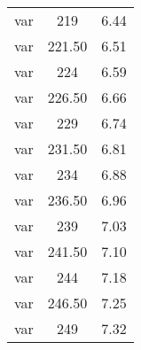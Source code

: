 \begin{table}[h]
\begin{center}
\begin{tabular}{ccc}
var & 219 & 6.44 \\

var & 221.50 & 6.51 \\

var & 224 & 6.59 \\

var & 226.50 & 6.66 \\

var & 229 & 6.74 \\

var & 231.50 & 6.81 \\

var & 234 & 6.88 \\

var & 236.50 & 6.96 \\

var & 239 & 7.03 \\

var & 241.50 & 7.10 \\

var & 244 & 7.18 \\

var & 246.50 & 7.25 \\

var & 249 & 7.32 \\

\hline 
\end{tabular}
\end{center}
\end{table}